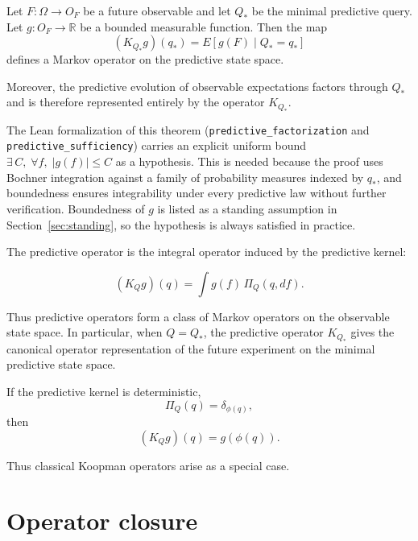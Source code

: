 \begin{theorem}
Let $F:\Omega\to O_F$ be a future observable and let $Q_*$ be the
minimal predictive query.  Let $g:O_F\to\mathbb R$ be a bounded
measurable function.  Then the map
\[
(K_{Q_*}g)(q_*)
=
E[g(F)\mid Q_*=q_*]
\]
defines a Markov operator on the predictive state space.

Moreover, the predictive evolution of observable expectations factors
through $Q_*$ and is therefore represented entirely by the operator
$K_{Q_*}$.
\end{theorem}

\begin{remark}
The Lean formalization of this theorem (\texttt{predictive\_factorization}
and \texttt{predictive\_sufficiency}) carries an explicit uniform bound
$\exists\,C,\;\forall f,\;|g(f)|\le C$ as a hypothesis.  This is needed
because the proof uses Bochner integration against a family of probability
measures indexed by $q_*$, and boundedness ensures integrability under
every predictive law without further verification.  Boundedness of $g$ is
listed as a standing assumption in Section~\ref{sec:standing}, so the
hypothesis is always satisfied in practice.
\end{remark}

\begin{remark}
The predictive operator is the integral operator induced by the
predictive kernel:

\[
(K_Q g)(q)
=
\int g(f)\,\Pi_Q(q,df).
\]

Thus predictive operators form a class of Markov operators on the
observable state space.  In particular, when $Q=Q_*$, the predictive
operator $K_{Q_*}$ gives the canonical operator representation of the
future experiment on the minimal predictive state space.
\end{remark}

\begin{proposition}
If the predictive kernel is deterministic,
\[
\Pi_Q(q)=\delta_{\phi(q)},
\]
then
\[
(K_Q g)(q)=g(\phi(q)).
\]
\end{proposition}

Thus classical Koopman operators arise as a special case.

\bigskip

\section{Operator closure}\label{sec:operator-closure}

